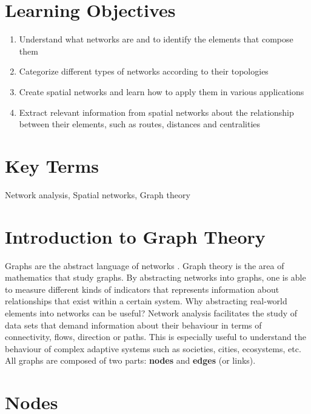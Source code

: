 \documentclass[
]{book}
\providecommand{\tightlist}{%
  \setlength{\itemsep}{0pt}\setlength{\parskip}{0pt}}
\begin{document}
\section*{Learning Objectives}\label{learning-objectives-6}

\begin{enumerate}
\def\labelenumi{\arabic{enumi}.}
\tightlist
\item
  Understand what networks are and to identify the elements that compose them
\item
  Categorize different types of networks according to their topologies
\item
  Create spatial networks and learn how to apply them in various applications
\item
  Extract relevant information from spatial networks about the relationship between their elements, such as routes, distances and centralities
\end{enumerate}

\section*{Key Terms}\label{key-terms-6}

Network analysis, Spatial networks, Graph theory

\section{Introduction to Graph Theory}\label{introduction-to-graph-theory}

Graphs are the abstract language of networks \citep{systems_innovation_graph_2015}. Graph theory is the area of mathematics that study graphs. By abstracting networks into graphs, one is able to measure different kinds of indicators that represents information about relationships that exist within a certain system. Why abstracting real-world elements into networks can be useful? Network analysis facilitates the study of data sets that demand information about their behaviour in terms of connectivity, flows, direction or paths. This is especially useful to understand the behaviour of complex adaptive systems such as societies, cities, ecosystems, etc. All graphs are composed of two parts: \textbf{nodes} and \textbf{edges} (or links).

\section{Nodes}\label{nodes}
\end{document}
